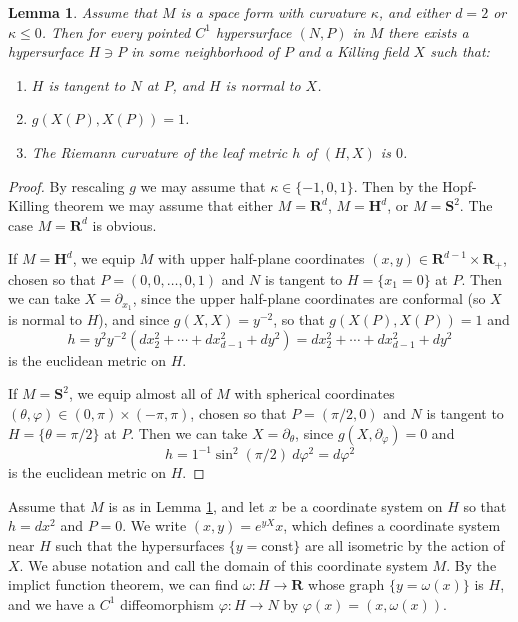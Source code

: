 \documentclass[reqno,12pt,letterpaper]{amsart}
\newcommand{\RR}{\mathbf{R}}
\newcommand{\Hyp}{\mathbf H}
\newcommand{\Sph}{\mathbf S}
\newtheorem{lemma}[theorem]{Lemma}
\theoremstyle{definition}
\numberwithin{equation}{section}
\begin{document}
\begin{lemma}\label{hopfKilling}
Assume that $M$ is a space form with curvature $\kappa$, and either $d = 2$ or $\kappa \leq 0$.
Then for every pointed $C^1$ hypersurface $(N, P)$ in $M$ there exists a hypersurface $H \ni P$ in some neighborhood of $P$ and a Killing field $X$ such that:
\begin{enumerate}
\item $H$ is tangent to $N$ at $P$, and $H$ is normal to $X$.
\item $g(X(P), X(P)) = 1$.
\item The Riemann curvature of the leaf metric $h$ of $(H, X)$ is $0$.
\end{enumerate}
\end{lemma}
\begin{proof}
By rescaling $g$ we may assume that $\kappa \in \{ -1, 0, 1\}$.
Then by the Hopf-Killing theorem we may assume that either $M = \RR^d$, $M = \Hyp^d$, or $M = \Sph^2$.
The case $M = \RR^d$ is obvious.

If $M = \Hyp^d$, we equip $M$ with upper half-plane coordinates $(x, y) \in \RR^{d - 1} \times \RR_+$, chosen so that $P = (0, 0, \dots, 0, 1)$ and $N$ is tangent to $H = \{x_1 = 0\}$ at $P$.
Then we can take $X = \partial_{x_1}$, since the upper half-plane coordinates are conformal (so $X$ is normal to $H$), and since $g(X, X) = y^{-2}$, so that $g(X(P), X(P)) = 1$ and
$$h = y^2y^{-2}(dx_2^2 + \cdots + dx_{d - 1}^2 + dy^2) = dx_2^2 + \cdots + dx_{d-1}^2 + dy^2$$
is the euclidean metric on $H$.

If $M = \Sph^2$, we equip almost all of $M$ with spherical coordinates $(\theta, \varphi) \in (0, \pi) \times (-\pi, \pi)$, chosen so that $P = (\pi/2, 0)$ and $N$ is tangent to $H = \{\theta = \pi/2\}$ at $P$.
Then we can take $X = \partial_\theta$, since $g(X, \partial_\varphi) = 0$ and
$$h = 1^{-1} \sin^2(\pi/2) ~d\varphi^2 = d\varphi^2$$
is the euclidean metric on $H$.
\end{proof}

Assume that $M$ is as in Lemma \ref{hopfKilling}, and let $x$ be a coordinate system on $H$ so that $h = dx^2$ and $P = 0$.
We write $(x, y) = e^{yX}x$, which defines a coordinate system near $H$ such that the hypersurfaces $\{y = \text{const}\}$ are all isometric by the action of $X$.
We abuse notation and call the domain of this coordinate system $M$.
By the implict function theorem, we can find $\omega: H \to \RR$ whose graph $\{y = \omega(x)\}$ is $H$, and we have a $C^1$ diffeomorphism $\varphi: H \to N$ by $\varphi(x) = (x, \omega(x))$.
\end{document}
